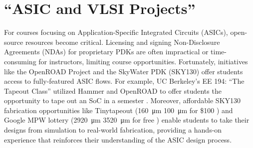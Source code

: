 \section{``ASIC and VLSI Projects''}

For courses focusing on Application-Specific Integrated Circuits (ASICs), open-source resources become critical. Licensing and signing Non-Disclosure Agreements (NDAs) for proprietary PDKs are often impractical or time-consuming for instructors, limiting course opportunities. Fortunately, initiatives like the OpenROAD Project and the SkyWater PDK (SKY130) offer students access to fully-featured ASIC flows. For example, UC Berkeley's EE 194: ``The Tapeout Class'' utilized Hammer and OpenROAD to offer students the opportunity to tape out an SoC in a semester \cite{ZhaoLatchUp}. Moreover, affordable SKY130 fabrication opportunities like Tinytapeout (\SI{160}{\micro\metre} \texttimes \SI{100}{\micro\metre} for \$100 \cite{tinytapeoutTinyTapeout}) and Google MPW lottery (\SI{2920}{\micro\metre} \texttimes \SI{3520}{\micro\metre} for free \cite{efablessCaravel}) enable students to take their designs from simulation to real-world fabrication, providing a hands-on experience that reinforces their understanding of the ASIC design process.

